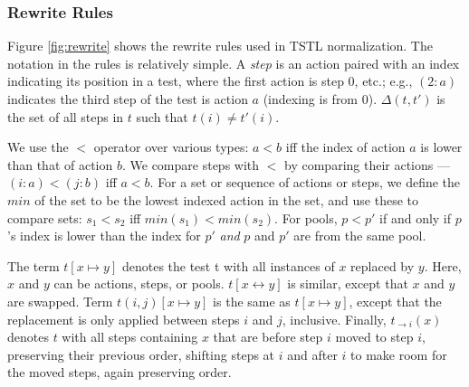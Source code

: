 \subsubsection{Rewrite Rules}

Figure \ref{fig:rewrite} shows the rewrite rules used in TSTL normalization.
The notation in the rules is relatively simple.
A \emph{step} is an action paired with an index indicating its
position in a test,
where the first action is step 0, etc.; e.g., $(2: a)$ indicates the
third step of the test is action $a$ (indexing is from 0). 
$\Delta(t,t')$ is the set of all steps in $t$ such that $t(i) \not= t'(i)$.

We use the $<$ operator over various types:
$a < b$ iff the index of action $a$ is lower
than that of action $b$.  We compare steps with $<$ by comparing their
actions --- $(i: a) < (j: b)$ iff $a < b$.  For a set or sequence of actions or steps, we define the $min$ of the
set to be the lowest indexed action in the set, and use
these to compare sets:  $s_1 < s_2$ iff $min(s_1) < min(s_2)$. For pools,
$p < p'$ if and only if $p$'s index is lower than the index for $p'$
\emph{and} $p$ and $p'$ are from the same pool.

The term $t[x \mapsto y]$ denotes the test t with all instances of $x$
replaced by $y$.  Here, $x$ and $y$ can be actions, steps, or pools.
$t[x \leftrightarrow y]$ is similar, except that $x$ and $y$ are
swapped.  Term $t(i,j)[x \mapsto y]$ is the same as $t[x \mapsto
y]$, except that the replacement is only applied between steps $i$ and
$j$, inclusive.  Finally, $t_{\rightarrow i}(x)$ denotes $t$ with all steps
containing $x$ that are before step $i$ moved to step $i$, preserving
their previous order, shifting steps at $i$ and after $i$ to make room for
the moved steps, again preserving order.


